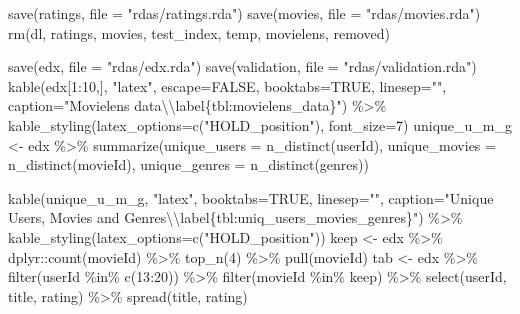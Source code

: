 \documentclass[
]{article}
\newenvironment{Shaded}{}{}
\newcommand{\AttributeTok}[1]{\textcolor[rgb]{0.49,0.56,0.16}{#1}}
\newcommand{\ConstantTok}[1]{\textcolor[rgb]{0.53,0.00,0.00}{#1}}
\newcommand{\DecValTok}[1]{\textcolor[rgb]{0.25,0.63,0.44}{#1}}
\newcommand{\FunctionTok}[1]{\textcolor[rgb]{0.02,0.16,0.49}{#1}}
\newcommand{\NormalTok}[1]{#1}
\newcommand{\OtherTok}[1]{\textcolor[rgb]{0.00,0.44,0.13}{#1}}
\newcommand{\SpecialCharTok}[1]{\textcolor[rgb]{0.25,0.44,0.63}{#1}}
\newcommand{\StringTok}[1]{\textcolor[rgb]{0.25,0.44,0.63}{#1}}
\begin{document}
\begin{Shaded}
\begin{Highlighting}[]
\FunctionTok{save}\NormalTok{(ratings, }\AttributeTok{file =} \StringTok{"rdas/ratings.rda"}\NormalTok{)}
\FunctionTok{save}\NormalTok{(movies, }\AttributeTok{file =} \StringTok{"rdas/movies.rda"}\NormalTok{)}
\FunctionTok{rm}\NormalTok{(dl, ratings, movies, test\_index, temp, movielens, removed)}

\FunctionTok{save}\NormalTok{(edx, }\AttributeTok{file =} \StringTok{"rdas/edx.rda"}\NormalTok{)}
\FunctionTok{save}\NormalTok{(validation, }\AttributeTok{file =} \StringTok{"rdas/validation.rda"}\NormalTok{)}
  \FunctionTok{kable}\NormalTok{(edx[}\DecValTok{1}\SpecialCharTok{:}\DecValTok{10}\NormalTok{,], }\StringTok{"latex"}\NormalTok{, }\AttributeTok{escape=}\ConstantTok{FALSE}\NormalTok{, }\AttributeTok{booktabs=}\ConstantTok{TRUE}\NormalTok{, }\AttributeTok{linesep=}\StringTok{""}\NormalTok{, }\AttributeTok{caption=}\StringTok{"Movielens data}\SpecialCharTok{\textbackslash{}\textbackslash{}}\StringTok{label\{tbl:movielens\_data\}"}\NormalTok{) }\SpecialCharTok{\%\textgreater{}\%}
    \FunctionTok{kable\_styling}\NormalTok{(}\AttributeTok{latex\_options=}\FunctionTok{c}\NormalTok{(}\StringTok{"HOLD\_position"}\NormalTok{), }\AttributeTok{font\_size=}\DecValTok{7}\NormalTok{)}
\NormalTok{unique\_u\_m\_g }\OtherTok{\textless{}{-}}\NormalTok{ edx }\SpecialCharTok{\%\textgreater{}\%} 
  \FunctionTok{summarize}\NormalTok{(}\AttributeTok{unique\_users =} \FunctionTok{n\_distinct}\NormalTok{(userId),}
            \AttributeTok{unique\_movies =} \FunctionTok{n\_distinct}\NormalTok{(movieId), }
            \AttributeTok{unique\_genres =} \FunctionTok{n\_distinct}\NormalTok{(genres))}

\FunctionTok{kable}\NormalTok{(unique\_u\_m\_g, }\StringTok{"latex"}\NormalTok{, }
      \AttributeTok{booktabs=}\ConstantTok{TRUE}\NormalTok{, }\AttributeTok{linesep=}\StringTok{""}\NormalTok{,}
      \AttributeTok{caption=}\StringTok{"Unique Users, Movies and Genres}\SpecialCharTok{\textbackslash{}\textbackslash{}}\StringTok{label\{tbl:uniq\_users\_movies\_genres\}"}\NormalTok{) }\SpecialCharTok{\%\textgreater{}\%}  \FunctionTok{kable\_styling}\NormalTok{(}\AttributeTok{latex\_options=}\FunctionTok{c}\NormalTok{(}\StringTok{"HOLD\_position"}\NormalTok{))}
\NormalTok{keep }\OtherTok{\textless{}{-}}\NormalTok{ edx }\SpecialCharTok{\%\textgreater{}\%}
\NormalTok{  dplyr}\SpecialCharTok{::}\FunctionTok{count}\NormalTok{(movieId) }\SpecialCharTok{\%\textgreater{}\%}
  \FunctionTok{top\_n}\NormalTok{(}\DecValTok{4}\NormalTok{) }\SpecialCharTok{\%\textgreater{}\%}
  \FunctionTok{pull}\NormalTok{(movieId)}
\NormalTok{tab }\OtherTok{\textless{}{-}}\NormalTok{ edx }\SpecialCharTok{\%\textgreater{}\%}
  \FunctionTok{filter}\NormalTok{(userId }\SpecialCharTok{\%in\%} \FunctionTok{c}\NormalTok{(}\DecValTok{13}\SpecialCharTok{:}\DecValTok{20}\NormalTok{)) }\SpecialCharTok{\%\textgreater{}\%} 
  \FunctionTok{filter}\NormalTok{(movieId }\SpecialCharTok{\%in\%}\NormalTok{ keep) }\SpecialCharTok{\%\textgreater{}\%} 
  \FunctionTok{select}\NormalTok{(userId, title, rating) }\SpecialCharTok{\%\textgreater{}\%} 
  \FunctionTok{spread}\NormalTok{(title, rating)}
  

\end{Highlighting}
\end{Shaded}
\end{document}
